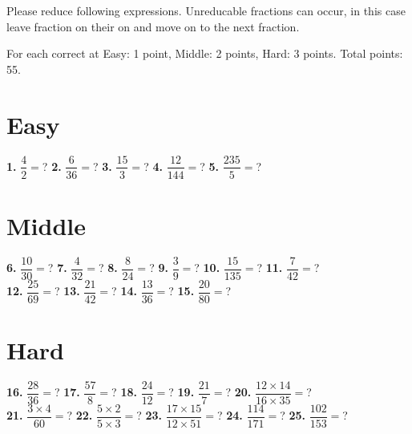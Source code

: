 \documentclass[a4paper]{article}
\begin{document}
\begin{Large}

Please reduce following expressions. Unreducable fractions can occur, in this case leave fraction on their on and move on to the next fraction.

For each correct at Easy: 1 point, Middle: 2 points, Hard: 3 points. Total points: 55.

\section* {Easy}
		
\textbf{1.} $\dfrac{4}{2}=$? \hspace{0.2cm}
\textbf{2.} $\dfrac{6}{36}=$? \hspace{0.2cm}
\textbf{3.} $\dfrac{15}{3}=$? \hspace{0.2cm}
\textbf{4.} $\dfrac{12}{144}=$? \hspace{0.2cm}
\textbf{5.} $\dfrac{235}{5}=$?


\section* {Middle}
		
\textbf{6.} $\dfrac{10}{30}=$? \hspace{0.2cm}
\textbf{7.} $\dfrac{4}{32}=$? \hspace{0.2cm}
\textbf{8.} $\dfrac{8}{24}=$? \hspace{0.2cm}
\textbf{9.} $\dfrac{3}{9}=$? \hspace{0.2cm}
\textbf{10.} $\dfrac{15}{135}=$? \hspace{0.2cm} 
\textbf{11.} $\dfrac{7}{42}=$? \\[0.75cm]
\textbf{12.} $\dfrac{25}{69}=$? \hspace{0.2cm}
\textbf{13.} $\dfrac{21}{42}=$? \hspace{0.2cm}
\textbf{14.} $\dfrac{13}{36}=$? \hspace{0.2cm}
\textbf{15.} $\dfrac{20}{80}=$?
		
\section* {Hard}

\textbf{16.} $\dfrac{28}{36}=$? \hspace{0.2cm}
\textbf{17.} $\dfrac{57}{8}=$? \hspace{0.2cm}
\textbf{18.} $\dfrac{24}{12}=$? \hspace{0.2cm}
\textbf{19.} $\dfrac{21}{7}=$?  \hspace{0.2cm}
\textbf{20.} $\dfrac{12 \times 14}{16 \times 35}=$? \\[0.75cm]
\textbf{21.} $\dfrac{3 \times 4}{60}=$? \hspace{0.2cm}
\textbf{22.} $\dfrac{5 \times 2}{5 \times 3}=$? \hspace{0.2cm}
\textbf{23.} $\dfrac{17 \times 15}{12 \times 51}=$?  \hspace{0.2cm}
\textbf{24.} $\dfrac{114}{171}=$? \hspace{0.2cm}
\textbf{25.} $\dfrac{102}{153}=$? 

\end{Large}
\end{document}
